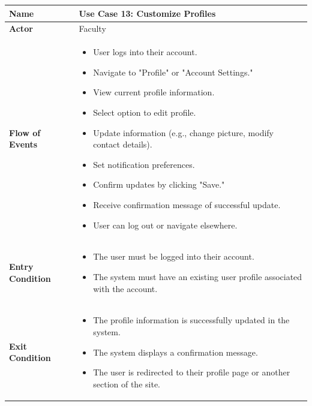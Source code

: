 \documentclass[11pt]{article}
\begin{document}
\begin{center}
\begin{tabular}{ | >{\bfseries}m{6em} | m{10cm} | }
  \hline
  \textbf{Name} & Use Case 13: Customize Profiles \\
  \hline
  \textbf{Actor} & Faculty \\
  \hline
  \textbf{Flow of Events} & 
  \begin{itemize}
      \item User logs into their account.
      \item Navigate to "Profile" or "Account Settings."
      \item View current profile information.
      \item Select option to edit profile.
      \item Update information (e.g., change picture, modify contact details).
      \item Set notification preferences.
      \item Confirm updates by clicking "Save."
      \item Receive confirmation message of successful update.
      \item User can log out or navigate elsewhere.
  \end{itemize} \\
  \hline
  \textbf{Entry Condition} & 
  \begin{itemize}
      \item The user must be logged into their account.
      \item The system must have an existing user profile associated with the account.
   \end{itemize} \\
      \hline
  \textbf{Exit Condition} & 
  \begin{itemize}
  \item The profile information is successfully updated in the system. 
  \item The system displays a confirmation message. 
  \item The user is redirected to their profile page or another section of the site.
     \end{itemize} \\
  \hline
\end{tabular}
\end{center}
\end{document}
